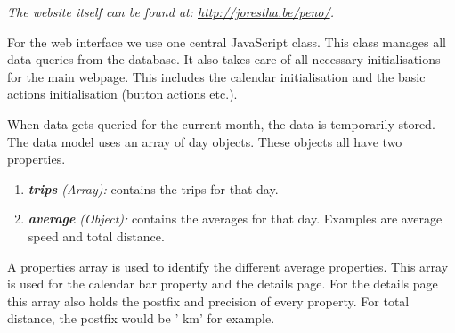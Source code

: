 \textit{The website itself can be found at: \url{http://jorestha.be/peno/}.}

For the web interface we use one central JavaScript class. This class manages all data queries from the database.
It also takes care of all necessary initialisations for the main webpage. This includes the calendar initialisation and
the basic actions initialisation (button actions etc.).

When data gets queried for the current month, the data is temporarily stored. The data
model uses an array of day objects. These objects all have two properties.
\begin{enumerate}
	\item \textit{\textbf{trips} (Array):} contains the trips for that day.
	\item \textit{\textbf{average} (Object):} contains the averages for that day.
	Examples are average speed and total distance.
\end{enumerate}
A properties array is used to identify the different average properties. This array
is used for the calendar bar property and the details page. For the details page this
array also holds the postfix and precision of every property. For total distance, the
postfix would be ' km' for example.
